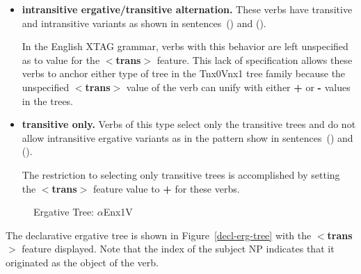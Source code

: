 \begin{itemize}
\item {\bf intransitive ergative/transitive alternation.}  These verbs
have transitive and intransitive variants as shown in sentences~() and
().



In the English XTAG grammar, verbs with this behavior are left unspecified as
to value for the {\bf$<$trans$>$} feature.  This lack of specification allows
these verbs to anchor either type of tree in the Tnx0Vnx1 tree family because
the unspecified {\bf$<$trans$>$} value of the verb can unify with either {\bf
+} or {\bf -} values in the trees.

\item {\bf transitive only.}  Verbs of this type select only the
transitive trees and do not allow intransitive ergative variants as in
the pattern show in sentences~() and ().


The restriction to selecting only transitive trees is accomplished by
setting the {\bf$<$trans$>$} feature value to {\bf +} for these verbs.
\end{itemize}

\begin{figure}[htb]
\centering
\mbox{}
\caption{Ergative Tree: $\alpha$Enx1V}
\label{decl-erg-tree}
\label{2;14,1}
\end{figure}

The declarative ergative tree is shown in Figure~\ref{decl-erg-tree} with the
{\bf $<$trans$>$} feature displayed.  Note that the index of the subject NP
indicates that it originated as the object of the verb.


